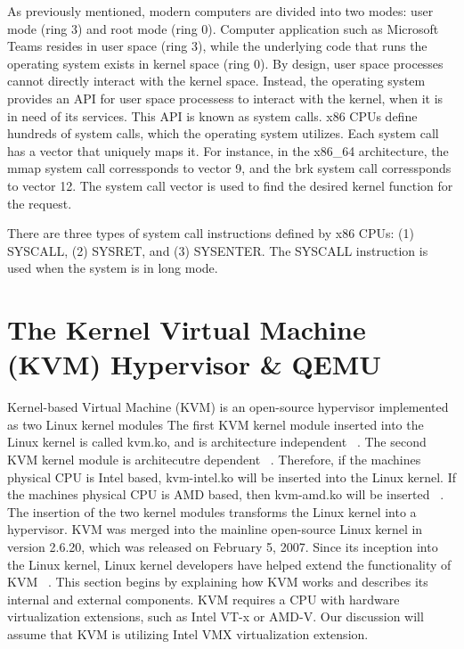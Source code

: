 \documentclass{report}
\begin{document}
\begin{spacing}{1.5}
{\large
As previously mentioned, modern computers are divided into two modes: user mode (ring 3) and root mode (ring 0). Computer application such as Microsoft Teams resides in user space (ring 3), while the underlying code that runs the operating system exists in kernel space (ring 0). By design, user space processes cannot directly interact with the kernel space. Instead, the operating system provides an API for user space processess to interact with the kernel, when it is in need of its services. This API is known as system calls. x86 CPUs define hundreds of system calls, which the operating system utilizes. Each system call has a vector that uniquely maps it. For instance, in the x86\_64 architecture, the mmap system call corressponds to vector 9, and the brk system call corressponds to vector 12. The system call vector is used to find the desired kernel function for the request. 
\newline
}


{\large
There are three types of system call instructions defined by x86 CPUs: (1) SYSCALL, (2) SYSRET, and (3) SYSENTER. The SYSCALL instruction is used when the system is in long mode.
\newline
}
























\section{The Kernel Virtual Machine (KVM) Hypervisor \& QEMU}


{\large 
Kernel-based Virtual Machine (KVM) is an open-source hypervisor implemented as two Linux kernel modules The first KVM kernel module inserted into the Linux kernel is called kvm.ko, and is architecture independent ~\cite{chirammal2016mastering}. The second KVM kernel module is architecutre dependent ~\cite{chirammal2016mastering}. Therefore, if the machines physical CPU is Intel based, kvm-intel.ko will be inserted into the Linux kernel. If the machines physical CPU is AMD based, then kvm-amd.ko will be inserted ~\cite{chirammal2016mastering}. The insertion of the two kernel modules transforms the Linux kernel into a hypervisor. KVM was merged into the mainline open-source Linux kernel in version 2.6.20, which was released on February 5, 2007. Since its inception into the Linux kernel, Linux kernel developers have helped extend the functionality of KVM ~\cite{goto2011kernel}. This section begins by explaining how KVM works and describes its internal and external components. KVM requires a CPU with hardware virtualization extensions, such as Intel VT-x or AMD-V. Our discussion will assume that KVM is utilizing Intel VMX virtualization extension.
\newline
}



\end{spacing}
\end{document}
